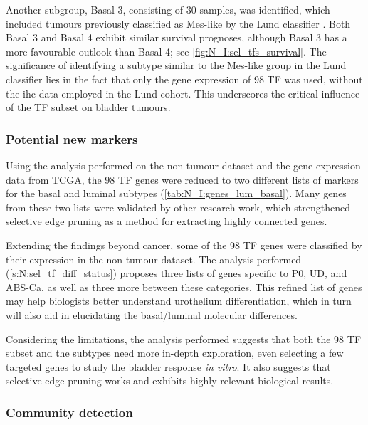Another subgroup, Basal 3, consisting of 30 samples, was identified, which included tumours previously classified as Mes-like by the Lund classifier \citep{Marzouka2018-ge}. Both Basal 3 and Basal 4 exhibit similar survival prognoses, although Basal 3 has a more favourable outlook than Basal 4; see \cref{fig:N_I:sel_tfs_survival}. The significance of identifying a subtype similar to the Mes-like group in the Lund classifier lies in the fact that only the gene expression of 98 TF was used, without the \acrlong{ihc} data employed in the Lund cohort. This underscores the critical influence of the TF subset on bladder tumours.



\subsubsection*{Potential new markers}

Using the analysis performed on the non-tumour dataset and the gene expression data from TCGA, the 98 TF genes were reduced to two different lists of markers for the basal and luminal subtypes (\cref{tab:N_I:genes_lum_basal}). Many genes from these two lists were validated by other research work, which strengthened selective edge pruning as a method for extracting highly connected genes.

Extending the findings beyond cancer, some of the 98 TF genes were classified by their expression in the non-tumour dataset. The analysis performed (\cref{s:N:sel_tf_diff_status}) proposes three lists of genes specific to P0, UD, and ABS-Ca, as well as three more between these categories. This refined list of genes may help biologists better understand urothelium differentiation, which in turn will also aid in elucidating the basal/luminal molecular differences.

Considering the limitations, the analysis performed suggests that both the 98 TF subset and the subtypes need more in-depth exploration, even selecting a few targeted genes to study the bladder response \textit{in vitro}. It also suggests that selective edge pruning works and exhibits highly relevant biological results.

\subsubsection*{Community detection}

